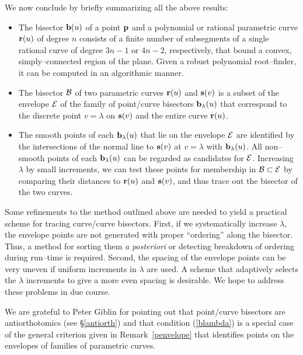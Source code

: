 We now conclude by briefly summarizing all the above results:
\begin{itemize}
\item
The bisector ${\bf b}(u)$ of a point ${\bf p}$ and a polynomial
or rational parametric curve ${\bf r}(u)$ of degree $n$ consists
of a finite number of subsegments of a single rational curve
of degree $3n-1$ or $4n-2$, respectively, that bound a convex,
simply--connected region of the plane. Given a robust polynomial
root--finder, it can be computed in an algorithmic manner.
\item
The bisector ${\cal B}$ of two parametric curves ${\bf r}(u)$
and ${\bf s}(v)$ is a subset of the envelope ${\cal E}$ of
the family of point/curve bisectors ${\bf b}_\lambda(u)$ that
correspond to the discrete point $v=\lambda$ on ${\bf s}(v)$
and the entire curve ${\bf r}(u)$.
\item
The smooth points of each ${\bf b}_\lambda(u)$ that lie on
the envelope ${\cal E}$ are identified by the intersections of
the normal line to ${\bf s}(v)$ at $v=\lambda$ with ${\bf b}_
\lambda(u)$. All non--smooth points of each ${\bf b}_\lambda
(u)$ can be regarded as candidates for ${\cal E}$. Increasing
$\lambda$ by small increments, we can test these points for
membership in ${\cal B}\subset{\cal E}$ by comparing their
distances to ${\bf r}(u)$ and ${\bf s}(v)$, and thus trace
out the bisector of the two curves.
\end{itemize}

Some refinements to the method outlined above are needed to
yield a practical scheme for tracing curve/curve bisectors.
First, if we systematically increase $\lambda$, the envelope
points are not generated with proper ``ordering'' along the
bisector. Thus, a method for sorting them {\it a posteriori\/}
or detecting breakdown of ordering during run--time is
required. Second, the spacing of the envelope points can
be very uneven if uniform increments in $\lambda$ are used.
A scheme that adaptively selects the $\lambda$ increments
to give a more even spacing is desirable. We hope to address
these problems in due course.

\begin{ackn}
We are grateful to Peter Giblin for pointing out that
point/curve bisectors are antiorthotomics (see \S\ref{antiorth})
and that condition (\ref{blambda}) is a special case of the
general criterion given in Remark~\ref{penvelope} that identifies
points on the envelopes of families of parametric curves.
\end{ackn}

